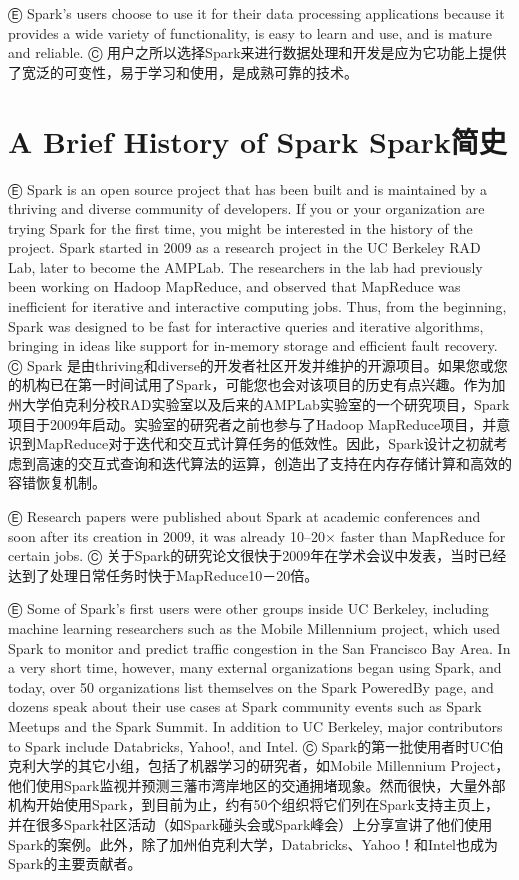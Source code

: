 Ⓔ Spark's users choose to use it for their data processing applications
because it provides a wide variety of functionality, is easy to learn
and use, and is mature and reliable. Ⓒ
用户之所以选择Spark来进行数据处理和开发是应为它功能上提供了宽泛的可变性，易于学习和使用，是成熟可靠的技术。

\section{A Brief History of Spark \textbar{}\textbar{}
Spark简史}\label{a-brief-history-of-spark-sparkux7b80ux53f2}

Ⓔ Spark is an open source project that has been built and is maintained
by a thriving and diverse community of developers. If you or your
organization are trying Spark for the first time, you might be
interested in the history of the project. Spark started in 2009 as a
research project in the UC Berkeley RAD Lab, later to become the AMPLab.
The researchers in the lab had previously been working on Hadoop
MapReduce, and observed that MapReduce was inefficient for iterative and
interactive computing jobs. Thus, from the beginning, Spark was designed
to be fast for interactive queries and iterative algorithms, bringing in
ideas like support for in-memory storage and efficient fault recovery. Ⓒ
Spark
是由thriving和diverse的开发者社区开发并维护的开源项目。如果您或您的机构已在第一时间试用了Spark，可能您也会对该项目的历史有点兴趣。作为加州大学伯克利分校RAD实验室以及后来的AMPLab实验室的一个研究项目，Spark项目于2009年启动。实验室的研究者之前也参与了Hadoop
MapReduce项目，并意识到MapReduce对于迭代和交互式计算任务的低效性。因此，Spark设计之初就考虑到高速的交互式查询和迭代算法的运算，创造出了支持在内存存储计算和高效的容错恢复机制。

Ⓔ Research papers were published about Spark at academic conferences and
soon after its creation in 2009, it was already 10--20× faster than
MapReduce for certain jobs. Ⓒ
关于Spark的研究论文很快于2009年在学术会议中发表，当时已经达到了处理日常任务时快于MapReduce10－20倍。

Ⓔ Some of Spark's first users were other groups inside UC Berkeley,
including machine learning researchers such as the Mobile Millennium
project, which used Spark to monitor and predict traffic congestion in
the San Francisco Bay Area. In a very short time, however, many external
organizations began using Spark, and today, over 50 organizations list
themselves on the Spark PoweredBy page, and dozens speak about their use
cases at Spark community events such as Spark Meetups and the Spark
Summit. In addition to UC Berkeley, major contributors to Spark include
Databricks, Yahoo!, and Intel. Ⓒ
Spark的第一批使用者时UC伯克利大学的其它小组，包括了机器学习的研究者，如Mobile
Millennium
Project，他们使用Spark监视并预测三藩市湾岸地区的交通拥堵现象。然而很快，大量外部机构开始使用Spark，到目前为止，约有50个组织将它们列在Spark支持主页上，并在很多Spark社区活动（如Spark碰头会或Spark峰会）上分享宣讲了他们使用Spark的案例。此外，除了加州伯克利大学，Databricks、Yahoo！和Intel也成为Spark的主要贡献者。

